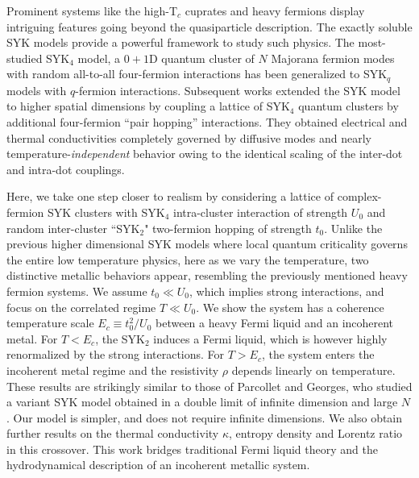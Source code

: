 \documentclass[twocolumn,floatfix,superscriptaddress]{revtex4-1}
\begin{document}
Prominent systems like the high-T$_c$ cuprates and heavy fermions display intriguing features going beyond the quasiparticle description\cite{emery_1995,emery_19952,varma_1996,mathur_1998,zaanen_2004,hartnoll_20152,hartnoll_2015,bruin_2013,stewart_2001}. 
The exactly soluble SYK models provide a powerful framework to study such physics.  The most-studied SYK$_4$ model, a $0+1$D quantum cluster of $N$ Majorana fermion modes with random all-to-all four-fermion interactions\cite{sachdev_1993, kitaev_kitp,sachdev_2015,maldacena_2016,polchinski_2016,fu_20162,you_2017,gu_2017,sannomiya_2017} has been generalized to SYK$_q$ models with $q$-fermion interactions.
Subsequent works\cite{gu_2016,davidson_2016} extended the SYK model to higher spatial dimensions by coupling a lattice of SYK$_{4}$ quantum clusters by additional four-fermion ``pair hopping'' interactions.   They obtained electrical and thermal conductivities completely governed by diffusive modes and nearly temperature-{\em independent} behavior owing to the identical scaling of the inter-dot and intra-dot couplings.  

Here, we take one step closer to realism by considering a lattice of complex-fermion SYK clusters with SYK$_4$ intra-cluster interaction of strength $U_0$ and random inter-cluster  ``SYK$_2$" two-fermion hopping of strength $t_0$\cite{kolovsky_2017,jian_2017,bi_2017,banerjee_2016,jian2_2017}.  Unlike the previous higher dimensional SYK models where local quantum criticality governs the entire low temperature physics, here as we vary the temperature, two distinctive metallic behaviors appear,  resembling the previously mentioned heavy fermion systems. We assume $t_0 \ll U_0$, which implies strong interactions, and focus on the correlated regime $T \ll U_0$.   We show the system has a coherence temperature scale $E_c \equiv t_0^2/U_0$\cite{jacquod_1997,kolovsky_2017,ho_1998} between a  heavy Fermi liquid  and an incoherent metal.   For $T < E_c$, the SYK$_2$ induces a Fermi liquid, which is however highly renormalized by the strong interactions.  For $T> E_c$, the system enters the incoherent metal regime and the resistivity $\rho$ depends linearly on temperature.   These results are strikingly similar to those of Parcollet and Georges\cite{parcollet_1999}, who studied a variant SYK model obtained in a double limit of infinite dimension and large $N$.   Our model is simpler, and does not require infinite dimensions.   We also obtain further results on the thermal conductivity $\kappa$, entropy density and Lorentz ratio\cite{franz_1853,sommerfeld_1927} in this crossover.  This  work bridges traditional Fermi liquid theory and the hydrodynamical description of an incoherent metallic system.
\end{document}
